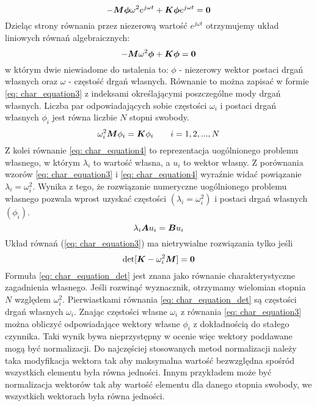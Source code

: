 \begin{equation} \label{eq: char_equation1}
-\bm{M}\bm{\phi}\omega^2 e^{j\omega t} +\bm{K\phi}e^{j\omega t} = \bm{0}
\end{equation}
Dzieląc strony równania przez niezerową wartość $e^{j\omega t}$ otrzymujemy układ liniowych równań algebraicznych:
\begin{equation} \label{eq: char_equation2}
-\bm{M}\omega^2 \bm{\phi} +\bm{K\phi} = \bm{0}
\end{equation}
w którym dwie niewiadome do ustalenia to: $\phi$ - niezerowy wektor postaci drgań własnych oraz $\omega$ - częstość drgań własnych. Równanie to można zapisać w formie \ref{eq: char_equation3} z indeksami określającymi poszczególne mody drgań własnych. Liczba par odpowiadających sobie częstości $\omega_i$ i postaci drgań własnych $\phi_i$ jest równa liczbie $N$ stopni swobody. 
\begin{equation} \label{eq: char_equation3}
\omega^2_i \bm{M}\phi_i = \bm{K}\phi_i\qquad i=1,2,...,N
\end{equation}
Z kolei równanie \ref{eq: char_equation4} to reprezentacja uogólnionego problemu własnego, w którym $\lambda_i$ to wartość własna, a $u_i$ to wektor własny. Z porównania wzorów \ref{eq: char_equation3} i \ref{eq: char_equation4} wyraźnie widać powiązanie $\lambda_i=\omega^2_i$. Wynika z tego, że rozwiązanie numeryczne uogólnionego problemu własnego pozwala wprost uzyskać częstości $(\lambda_i=\omega^2_i)$ i postaci drgań własnych $(\phi_i)$. 
\begin{equation} \label{eq: char_equation4}
\lambda_i \bm{A}u_i = \bm{B}u_i
\end{equation}
Układ równań (\ref{eq: char_equation3}) ma nietrywialne rozwiązania tylko jeśli
\begin{equation} \label{eq: char_equation_det}
\det[\bm{K}-\omega^2_i \bm{M}] = \bm{0}
\end{equation}
Formuła \ref{eq: char_equation_det} jest znana jako równanie charakterystyczne zagadnienia własnego. Jeśli rozwinąć wyznacznik, otrzymamy wielomian stopnia $N$ względem $\omega^2_i$. Pierwiastkami równania \ref{eq: char_equation_det} są częstości drgań własnych $\omega_i$. Znając częstości własne $\omega_i$ z równania \ref{eq: char_equation3} można obliczyć odpowiadające wektory własne $\phi_i$ z dokładnością do stałego czynnika. Taki wynik bywa nieprzystępny w ocenie więc wektory poddawane mogą być normalizacji. Do najczęściej stosowanych metod normalizacji należy taka modyfikacja wektora tak aby maksymalna wartość bezwzględna spośród wszystkich elementu była równa jedności. Innym przykładem może być normalizacja wektorów tak aby wartość elementu dla danego stopnia swobody, we wszystkich wektorach była równa jedności.

